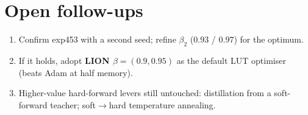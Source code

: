 \documentclass[11pt]{article}
\begin{document}
\section{Open follow-ups}
\begin{enumerate}\setlength\itemsep{1pt}
\item Confirm exp453 with a second seed; refine $\beta_2$ ($0.93$ / $0.97$)
for the optimum.
\item If it holds, adopt \textbf{LION $\beta=(0.9,0.95)$} as the default LUT
optimiser (beats Adam at half memory).
\item Higher-value hard-forward levers still untouched: distillation from a
soft-forward teacher; soft$\to$hard temperature annealing.
\end{enumerate}
\end{document}
